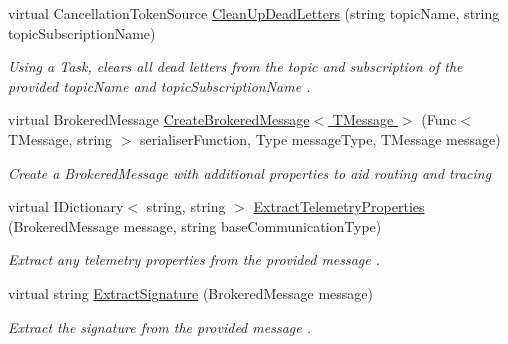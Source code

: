 \begin{DoxyCompactItemize}
virtual Cancellation\+Token\+Source \hyperlink{classCqrs_1_1Azure_1_1ServiceBus_1_1AzureServiceBus_a8d1d5833d49b7793933825f2a13fb8b7_a8d1d5833d49b7793933825f2a13fb8b7}{Clean\+Up\+Dead\+Letters} (string topic\+Name, string topic\+Subscription\+Name)
\begin{DoxyCompactList}\small\item\em Using a Task, clears all dead letters from the topic and subscription of the provided {\itshape topic\+Name}  and {\itshape topic\+Subscription\+Name} . \end{DoxyCompactList}\item 
virtual Brokered\+Message \hyperlink{classCqrs_1_1Azure_1_1ServiceBus_1_1AzureServiceBus_abd7070403c94e0b404ffa00c07c94a50_abd7070403c94e0b404ffa00c07c94a50}{Create\+Brokered\+Message$<$ T\+Message $>$} (Func$<$ T\+Message, string $>$ serialiser\+Function, Type message\+Type, T\+Message message)
\begin{DoxyCompactList}\small\item\em Create a Brokered\+Message with additional properties to aid routing and tracing \end{DoxyCompactList}\item 
virtual I\+Dictionary$<$ string, string $>$ \hyperlink{classCqrs_1_1Azure_1_1ServiceBus_1_1AzureServiceBus_a735e3fddc6abec6a7eaa76acde57f46a_a735e3fddc6abec6a7eaa76acde57f46a}{Extract\+Telemetry\+Properties} (Brokered\+Message message, string base\+Communication\+Type)
\begin{DoxyCompactList}\small\item\em Extract any telemetry properties from the provided {\itshape message} . \end{DoxyCompactList}\item 
virtual string \hyperlink{classCqrs_1_1Azure_1_1ServiceBus_1_1AzureServiceBus_a6efd119a61f555a4a8c456f4821e83bf_a6efd119a61f555a4a8c456f4821e83bf}{Extract\+Signature} (Brokered\+Message message)
\begin{DoxyCompactList}\small\item\em Extract the signature from the provided {\itshape message} . \end{DoxyCompactList}\end{DoxyCompactItemize}
